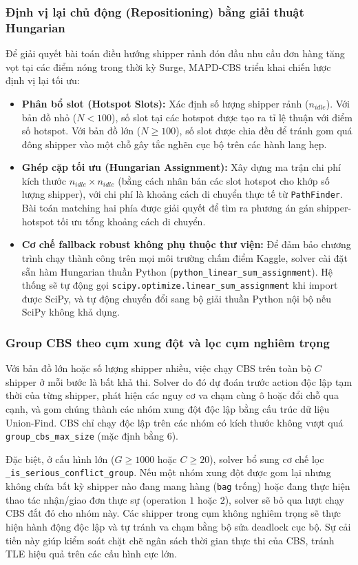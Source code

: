 \documentclass[conference]{IEEEtran}
\begin{document}
\subsubsection{Định vị lại chủ động (Repositioning) bằng giải thuật Hungarian}
Để giải quyết bài toán điều hướng shipper rảnh đón đầu nhu cầu đơn hàng tăng vọt tại các điểm nóng trong thời kỳ Surge, MAPD-CBS triển khai chiến lược định vị lại tối ưu:
\begin{itemize}
    \item \textbf{Phân bổ slot (Hotspot Slots):} Xác định số lượng shipper rảnh ($n_{idle}$). Với bản đồ nhỏ ($N < 100$), số slot tại các hotspot được tạo ra tỉ lệ thuận với điểm số hotspot. Với bản đồ lớn ($N \ge 100$), số slot được chia đều để tránh gom quá đông shipper vào một chỗ gây tắc nghẽn cục bộ trên các hành lang hẹp.
    \item \textbf{Ghép cặp tối ưu (Hungarian Assignment):} Xây dựng ma trận chi phí kích thước $n_{idle} \times n_{idle}$ (bằng cách nhân bản các slot hotspot cho khớp số lượng shipper), với chi phí là khoảng cách di chuyển thực tế từ \texttt{PathFinder}. Bài toán matching hai phía được giải quyết để tìm ra phương án gán shipper-hotspot tối ưu tổng khoảng cách di chuyển.
    \item \textbf{Cơ chế fallback robust không phụ thuộc thư viện:} Để đảm bảo chương trình chạy thành công trên mọi môi trường chấm điểm Kaggle, solver cài đặt sẵn hàm Hungarian thuần Python (\texttt{python\_linear\_sum\_assignment}). Hệ thống sẽ tự động gọi \texttt{scipy.optimize.linear\_sum\_assignment} khi import được SciPy, và tự động chuyển đổi sang bộ giải thuần Python nội bộ nếu SciPy không khả dụng.
\end{itemize}

\subsubsection{Group CBS theo cụm xung đột và lọc cụm nghiêm trọng}
Với bản đồ lớn hoặc số lượng shipper nhiều, việc chạy CBS trên toàn bộ $C$ shipper ở mỗi bước là bất khả thi. Solver do đó dự đoán trước action độc lập tạm thời của từng shipper, phát hiện các nguy cơ va chạm cùng ô hoặc đổi chỗ qua cạnh, và gom chúng thành các nhóm xung đột độc lập bằng cấu trúc dữ liệu Union-Find. CBS chỉ chạy độc lập trên các nhóm có kích thước không vượt quá \texttt{group\_cbs\_max\_size} (mặc định bằng $6$).

Đặc biệt, ở cấu hình lớn ($G \ge 1000$ hoặc $C \ge 20$), solver bổ sung cơ chế lọc \texttt{\_is\_serious\_conflict\_group}. Nếu một nhóm xung đột được gom lại nhưng không chứa bất kỳ shipper nào đang mang hàng (\texttt{bag} trống) hoặc đang thực hiện thao tác nhận/giao đơn thực sự (operation $1$ hoặc $2$), solver sẽ bỏ qua lượt chạy CBS đắt đỏ cho nhóm này. Các shipper trong cụm không nghiêm trọng sẽ thực hiện hành động độc lập và tự tránh va chạm bằng bộ sửa deadlock cục bộ. Sự cải tiến này giúp kiểm soát chặt chẽ ngân sách thời gian thực thi của CBS, tránh TLE hiệu quả trên các cấu hình cực lớn.
\end{document}
